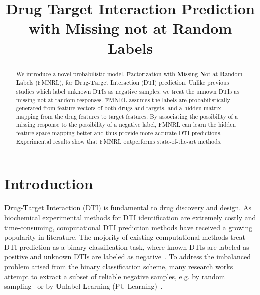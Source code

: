 \documentclass[sigconf,anonymous]{acmart}
\begin{document}
\title{Drug Target Interaction Prediction with Missing not at Random Labels}

\begin{abstract}
We introduce a novel probabilistic model, \textbf{F}actorization with \textbf{M}issing \textbf{N}ot at \textbf{R}andom \textbf{L}abels (FMNRL), for \textbf{D}rug-\textbf{T}arget \textbf{I}nteraction (DTI) prediction. Unlike previous studies which label unknown DTIs as negative samples, we treat the unnown DTIs as missing not at random responses. FMNRL assumes the labels are probabilistically generated from feature vectors of both drugs and targets, and a hidden matrix mapping from the drug features to target features. By associating the possibility of a missing response to the possibility of a negative label, FMNRL can learn the hidden feature space mapping better and thus provide more accurate DTI predictions. Experimental results show that FMNRL outperforms state-of-the-art methods.

\end{abstract}



\maketitle
\section{Introduction}\label{sec:introduction}
\textbf{D}rug-\textbf{T}arget \textbf{I}nteraction (DTI) is fundamental to drug discovery and design. As biochemical experimental methods for DTI identification are extremely costly and time-consuming, computational DTI prediction methods have received a growing popularity in literature. The mojority of existing computational methods treat DTI prediction as a binary classification task, where known DTIs are labeled as positive and unknown DTIs are labeled as negative~\cite{Ding2013Similarity}. To address the imbalanced problem arised from the binary classification scheme, many research works attempt to extract a subset of reliable negative samples, e.g. by random sampling~\cite{Luo2017Network} or by \textbf{U}nlabel \textbf{L}earning (PU Learning)~\cite{Peng2017Screening}.
\end{document}

